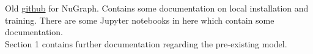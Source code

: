 \documentclass{article}
\begin{document}

\begin{spacing}{1.0}

Old \href{https://github.com/exatrkx/NuGraph/tree/main}{\color{blue} github} for NuGraph. Contains some documentation on local installation and training. There are some Jupyter notebooks in here which contain some documentation.\\[0.20cm]

Section 1 contains further documentation regarding the pre-existing model.







% 


\end{spacing}
\end{document}
